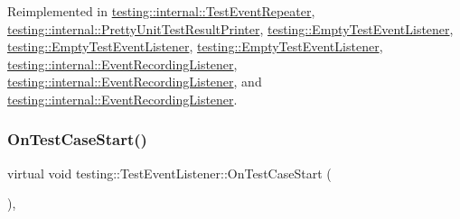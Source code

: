 Reimplemented in \mbox{\hyperlink{classtesting_1_1internal_1_1_test_event_repeater_a70124c738caa338bcd723eb2a51c8b3e}{testing\+::internal\+::\+Test\+Event\+Repeater}}, \mbox{\hyperlink{classtesting_1_1internal_1_1_pretty_unit_test_result_printer_adcb68c729565d4bcdf8418a52902c3de}{testing\+::internal\+::\+Pretty\+Unit\+Test\+Result\+Printer}}, \mbox{\hyperlink{classtesting_1_1_empty_test_event_listener_a7f9a84967fde01000b7a56e9e84b6052}{testing\+::\+Empty\+Test\+Event\+Listener}}, \mbox{\hyperlink{classtesting_1_1_empty_test_event_listener_a7f9a84967fde01000b7a56e9e84b6052}{testing\+::\+Empty\+Test\+Event\+Listener}}, \mbox{\hyperlink{classtesting_1_1_empty_test_event_listener_ae4707ed9cc7ace5241bc8ccc4051209b}{testing\+::\+Empty\+Test\+Event\+Listener}}, \mbox{\hyperlink{classtesting_1_1internal_1_1_event_recording_listener_a3ce90fda790857eb64444038a5b3258f}{testing\+::internal\+::\+Event\+Recording\+Listener}}, \mbox{\hyperlink{classtesting_1_1internal_1_1_event_recording_listener_a3ce90fda790857eb64444038a5b3258f}{testing\+::internal\+::\+Event\+Recording\+Listener}}, and \mbox{\hyperlink{classtesting_1_1internal_1_1_event_recording_listener_a18c28e1d1c3a1e74e225966456786f8e}{testing\+::internal\+::\+Event\+Recording\+Listener}}.

\mbox{\label{classtesting_1_1_test_event_listener_ac48628c9f78d3e10bff77c7366e9e780}} 
\subsubsection{\texorpdfstring{OnTestCaseStart()}{OnTestCaseStart()}\hspace{0.1cm}{\footnotesize\ttfamily [3/3]}}
{\footnotesize\ttfamily virtual void testing\+::\+Test\+Event\+Listener\+::\+On\+Test\+Case\+Start (\begin{DoxyParamCaption}\item[{const \mbox{\hyperlink{classtesting_1_1_test_case}{Test\+Case}} \&}]{ }\end{DoxyParamCaption})\hspace{0.3cm}{\ttfamily [inline]}, {\ttfamily [virtual]}}



